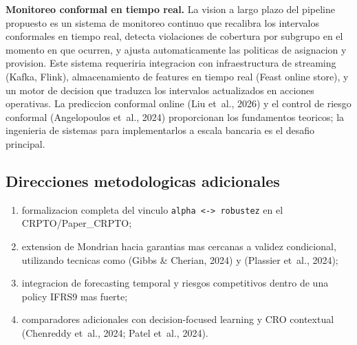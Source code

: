 \documentclass[
  spanish,
  11pt,
  letterpaper,
]{scrbook}
\providecommand{\tightlist}{%
  \setlength{\itemsep}{0pt}\setlength{\parskip}{0pt}}
\theoremstyle{plain}
\theoremstyle{remark}
\begin{document}
\textbf{Monitoreo conformal en tiempo real.} La vision a largo plazo del
pipeline propuesto es un sistema de monitoreo continuo que recalibra los
intervalos conformales en tiempo real, detecta violaciones de cobertura
por subgrupo en el momento en que ocurren, y ajusta automaticamente las
politicas de asignacion y provision. Este sistema requeriria integracion
con infraestructura de streaming (Kafka, Flink), almacenamiento de
features en tiempo real (Feast online store), y un motor de decision que
traduzca los intervalos actualizados en acciones operativas. La
prediccion conformal online (Liu et~al., 2026) y el control de riesgo
conformal (Angelopoulos et~al., 2024) proporcionan los fundamentos
teoricos; la ingenieria de sistemas para implementarlos a escala
bancaria es el desafio principal.

\subsection{Direcciones metodologicas
adicionales}\label{direcciones-metodologicas-adicionales}

\begin{enumerate}
\def\labelenumi{\arabic{enumi}.}
\tightlist
\item
  formalizacion completa del vinculo
  \texttt{alpha\ \textless{}-\textgreater{}\ robustez} en el
  CRPTO/Paper\_CRPTO;
\item
  extension de Mondrian hacia garantias mas cercanas a validez
  condicional, utilizando tecnicas como (Gibbs \& Cherian, 2024) y
  ({Plassier et~al.}, 2024);
\item
  integracion de forecasting temporal y riesgos competitivos dentro de
  una policy IFRS9 mas fuerte;
\item
  comparadores adicionales con decision-focused learning y CRO
  contextual ({Chenreddy et~al.}, 2024; Patel et~al., 2024).
\end{enumerate}
\end{document}
